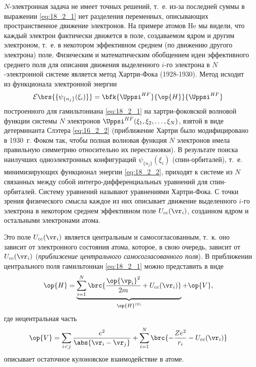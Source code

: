 $N$-электронная задача не имеет точных решений, т.~е. из-за последней суммы в выражении \eqref{eq:18_2_1} нет разделения переменных, описывающих пространственное движение электронов. На примере атомов He мы видели, что каждый электрон фактически движется в поле, создаваемом ядром и другим электроном, т.~е. в некотором эффективном среднем (по движению другого электрона) поле. Физическим и математическим обобщением идеи эффективного среднего поля для описания движения выделенного $i$-го электрона в $N$-электронной системе является метод Хартри-Фока\footnotemark{} (1928-1930). Метод исходит из функционала электронной энергии
%
\begin{equation}
\label{eq:18_2_2}
\mathcal{E}\brs{\{\psi_{\{n_j\}}(\xi_i)\}} = \bfk{\Uppsi^{HF}}{\op{H}}{\Uppsi^{HF}}
\end{equation}
построенного для гамильтониана \eqref{eq:18_2_1} на хартри-фоковской волновой функции системы $N$ электронов $\Uppsi^{HF}(\xi_1, \xi_2, \dots, \xi_N)$, взятой в виде детерминанта Слэтера \eqref{eq:16_2_2} (приближение Хартри было модифицировано в 1930~г. Фоком так, чтобы полная волновая функция $N$ электронов имела правильную симметрию относительно их перестановки). В результате поиска наилучших одноэлектронных конфигураций $\psi_{\{n_j\}}(\xi_i)$ (спин-орбиталей), т.~е. минимизирующих функционал энергии \eqref{eq:18_2_2}, приходят к системе из $N$ связанных между собой интегро-дифференциальных уравнений для спин-орбиталей. Систему уравнений называют уравнениями Хартри-Фока. С точки зрения физического смысла каждое из них описывает движение выделенного $i$-го электрона в некотором среднем эффективном поле $U_{cc}(\vr_i)$, созданном ядром и остальными электронами атома. 


Это поле $U_{cc}(\vr_i)$ является центральным и самосогласованным, т.~к. оно зависит от электронного состояния атома, которое, в свою очередь, зависит от $U_{cc}(\vr_i)$ ({\em приближение центрального самосогласованного поля}). В приближении центрального поля гамильтониан \eqref{eq:18_2_1} можно представить в виде
\begin{equation}
\label{eq:18_2_3}
\op{H} = \underbrace{\sum_{i=1}^{N} \brc{\frac{\op{\vp_i}^2}{2m} + U_{cc}(\vr_i)}}_{\op{H}^{(0)}} + \op{V},
\end{equation}
где нецентральная часть
$$
\op{V} = \sum_{i<j} \frac{e^2}{\abs{\vr_i - \vr_j}} + \sum_{i=1}^N \brc{-\frac{Ze^2}{r_i} - U_{cc}(\vr_i)}
$$
описывает остаточное кулоновское взаимодействие в атоме.

